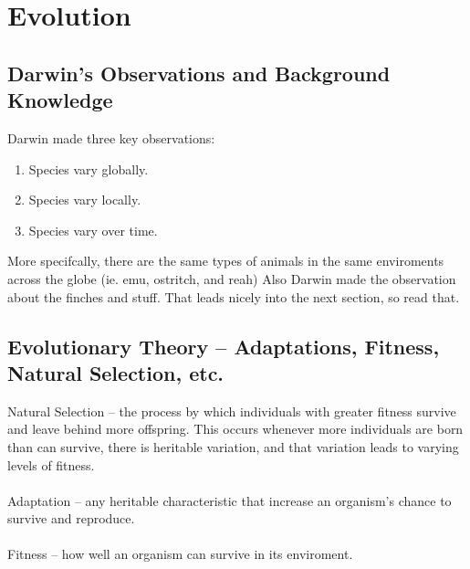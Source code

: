 \documentclass{article}
\begin{document}
\section{Evolution} %

\subsection{Darwin's Observations and Background Knowledge}
Darwin made three key observations:
\begin{enumerate}
\item Species vary globally.
\item Species vary locally.
\item Species vary over time.
\end{enumerate}
More specifcally, there are the same types of animals in the same enviroments across the globe (ie. emu, ostritch, and reah)
Also Darwin made the observation about the finches and stuff.
That leads nicely into the next section, so read that.

\subsection{Evolutionary Theory -- Adaptations, Fitness, Natural Selection, etc.}
Natural Selection -- the process by which individuals with greater fitness survive and leave behind more offspring.
This occurs whenever more individuals are born than can survive, there is heritable variation, and that variation leads to varying levels of fitness.\\
\\
Adaptation -- any heritable characteristic that increase an organism's chance to survive and reproduce.\\
\\
Fitness -- how well an organism can survive in its enviroment.
\end{document}
